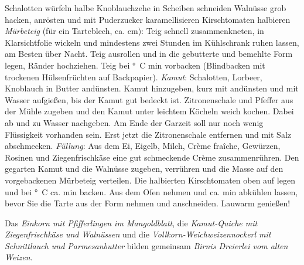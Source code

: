\begin{recipe}
    \preparation
    {
        \step Schalotten würfeln
        \step halbe Knoblauchzehe in Scheiben schneiden
        \step Walnüsse grob hacken, anrösten und mit Puderzucker karamellisieren
        \step Kirschtomaten halbieren
        \step \emph{Mürbeteig} (für ein Tarteblech, ca. \unit[15x30]{cm}): Teig schnell zusammenkneten, in Klarsichtfolie wickeln und mindestens zwei Stunden im Kühlschrank ruhen lassen, am Besten über Nacht. 
        \step Teig ausrollen und in die gebutterte und bemehlte Form legen, Ränder hochziehen. Teig bei \unit[160]{\degree C} \unit[15]{min} vorbacken (Blindbacken mit trockenen Hülsenfrüchten auf Backpapier).
        \step \emph{Kamut}: Schalotten, Lorbeer, Knoblauch in Butter andünsten. Kamut hinzugeben, kurz mit andünsten und mit Wasser aufgießen, bis der Kamut gut bedeckt ist. 
        \step Zitronenschale und Pfeffer aus der Mühle zugeben und den Kamut unter leichtem Köcheln weich kochen. Dabei ab und zu Wasser nachgeben. Am Ende der Garzeit soll nur noch wenig Flüssigkeit vorhanden sein. 
        \step Erst jetzt die Zitronenschale entfernen und mit Salz abschmecken.
        \step \emph{Füllung}: Aus dem Ei, Eigelb, Milch, Crème fraîche, Gewürzen, Rosinen und Ziegenfrischkäse eine gut schmeckende Crème zusammenrühren. 
        \step Den gegarten Kamut und die Walnüsse zugeben, verrühren und die Masse auf den vorgebackenen Mürbeteig verteilen. 
        \step Die halbierten Kirschtomaten oben auf legen und bei \unit[160]{\degree C} ca. \unit[30]{min} backen.
        \step Aus dem Ofen nehmen und ca. \unit[10]{min} abkühlen lassen, bevor Sie die Tarte aus der Form nehmen und anschneiden. 
		\step Lauwarm genießen!
    }
    
    \hint
    {
    	Das \emph{Einkorn mit Pfifferlingen im Mangoldblatt}, die \emph{Kamut-Quiche mit Ziegenfrischkäse und Walnüssen} und die \emph{Vollkorn-Weichweizennockerl mit Schnittlauch und Parmesanbutter} bilden gemeinsam \emph{Birnis Dreierlei vom alten Weizen}.
    }
\end{recipe}